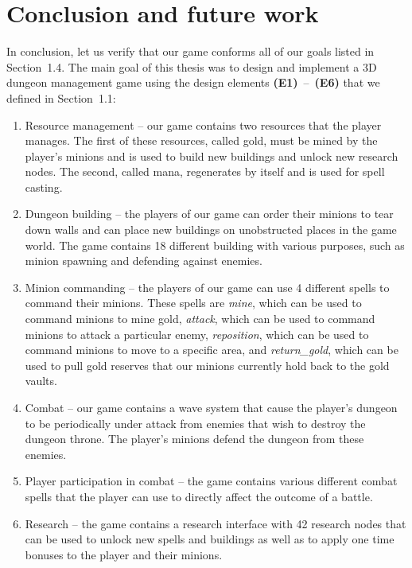 \chapter*{Conclusion and future work}

In conclusion, let us verify that  our game conforms all of our goals listed in Section~1.4. The main goal of this thesis was to design
and implement a 3D dungeon management game using the design elements \textbf{(E1)}~--~\textbf{(E6)} that we defined in Section~1.1:

\begin{enumerate}[label=\textbf{(E\arabic*)}]
    \item Resource management -- our game contains two resources that the player manages. The first of these resources, called gold, must
        be mined by the player's minions and is used to build new buildings and unlock new research nodes. The second, called mana,
        regenerates by itself and is used for spell casting.
    \item Dungeon building -- the players of our game can order their minions to tear down walls and can place new buildings on
        unobstructed places in the game world. The game contains 18 different building with various purposes, such as minion
        spawning and defending against enemies.
    \item Minion commanding -- the players of our game can use 4 different spells to command their minions. These spells are
        \emph{mine}, which can be used to command minions to mine gold, \emph{attack}, which can be used to command minions to attack
        a particular enemy, \emph{reposition}, which can be used to command minions to move to a specific area, and \emph{return\_gold},
        which can be used to pull gold reserves that our minions currently hold back to the gold vaults.
    \item Combat -- our game contains a wave system that cause the player's dungeon to be periodically under attack from enemies that wish
        to destroy the dungeon throne. The player's minions defend the dungeon from these enemies.
    \item Player participation in combat -- the game contains various different combat spells that the player can use to directly affect
        the outcome of a battle.
    \item Research -- the game contains a research interface with 42 research nodes that can be used to unlock new spells and buildings as
        well as to apply one time bonuses to the player and their minions.
\end{enumerate}

